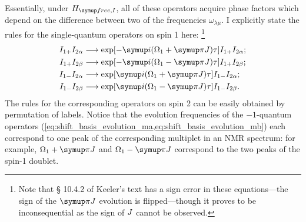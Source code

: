 Essentially, under $\HfreeI$, all of these operators acquire phase factors which depend on the difference between two of the frequencies $\omega_{\lambda\mu}$.
I explicitly state the rules for the single-quantum operators on spin 1 here:%
\footnote{Note that \S{} 10.4.2 of Keeler's text\autocite{Keeler2010} has a sign error in these equations---the sign of the $\cpi J\/$ evolution is flipped---though it proves to be inconsequential as the sign of $J\/$ cannot be observed.}
\begin{align}
    I_{1+}I_{2\alpha} &\longrightarrow \exp[-\mi(\Omega_1 + \cpi J)\tau] I_{1+}I_{2\alpha}; \label{eq:shift_basis_evolution_pa} \\
    I_{1+}I_{2\beta} &\longrightarrow \exp[-\mi(\Omega_1 - \cpi J)\tau] I_{1+}I_{2\beta}; \label{eq:shift_basis_evolution_pb} \\
    I_{1-}I_{2\alpha} &\longrightarrow \exp[\mi(\Omega_1 + \cpi J)\tau] I_{1-}I_{2\alpha}; \label{eq:shift_basis_evolution_ma} \\
    I_{1-}I_{2\beta} &\longrightarrow \exp[\mi(\Omega_1 - \cpi J)\tau] I_{1-}I_{2\beta}. \label{eq:shift_basis_evolution_mb}
\end{align}
The rules for the corresponding operators on spin 2 can be easily obtained by permutation of labels.
Notice that the evolution frequencies of the $-1$-quantum operators (\cref{eq:shift_basis_evolution_ma,eq:shift_basis_evolution_mb}) each correspond to one peak of the corresponding multiplet in an NMR spectrum: for example, $\Omega_1 + \cpi J\/$ and $\Omega_1 - \cpi J\/$ correspond to the two peaks of the spin-1 doublet.

